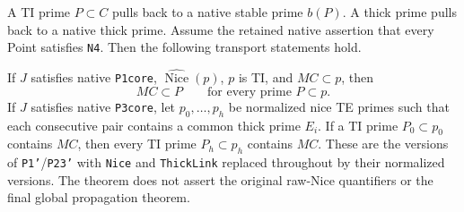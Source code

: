 \begin{theorem}
\label{AC-G104-prime}
A TI prime \(P\subset C\) pulls back to a native stable prime
\(b(P)\).  A thick prime pulls back to a native thick prime.
Assume the retained native assertion that every Point satisfies
\texttt{N4}.  Then the following transport statements hold.

If \(J\) satisfies native \texttt{P1core},
\(\widehat{\operatorname{Nice}}(p)\), \(p\) is TI,
and \(MC\subset p\), then
\[
                 MC\subset P\qquad\text{for every prime }P\subset p.
\tag{G104.8}
\]
If \(J\) satisfies native \texttt{P3core}, let
\(p_0,\ldots,p_h\) be normalized nice TE primes such that
each consecutive pair contains a common thick prime \(E_i\).
If a TI prime \(P_0\subset p_0\) contains \(MC\), then
every TI prime \(P_h\subset p_h\) contains \(MC\).
These are the versions of \texttt{P1'}/\texttt{P23'} with
\texttt{Nice} and \texttt{ThickLink} replaced throughout by
their normalized versions.  The theorem does not assert the
original raw-Nice quantifiers or the final global propagation theorem.
\end{theorem}


